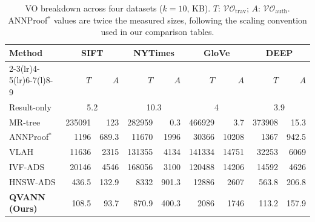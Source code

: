 \begin{table}[!t]
\centering
\caption{VO breakdown across four datasets ($k=10$, KB). $T$: $\mathcal{VO}_{\mathrm{trav}}$; $A$: $\mathcal{VO}_{\mathrm{auth}}$. ANNProof$^{*}$ values are twice the measured sizes, following the scaling convention used in our comparison tables.}
\label{tab:vo_breakdown_adjusted}
\vspace{-0.2cm}
\footnotesize
\setlength{\tabcolsep}{2pt}
\renewcommand{\arraystretch}{1.1}
\begin{tabular}{@{}l*{4}{rr}@{}}
\toprule
\multirow{2}{*}{Method} & \multicolumn{2}{c}{\textsf{SIFT}} & \multicolumn{2}{c}{\textsf{NYTimes}} & \multicolumn{2}{c}{\textsf{GloVe}} & \multicolumn{2}{c}{\textsf{DEEP}} \\
\cmidrule(lr){2-3}\cmidrule(lr){4-5}\cmidrule(lr){6-7}\cmidrule(l){8-9}
& $T$ & $A$ & $T$ & $A$ & $T$ & $A$ & $T$ & $A$ \\
\midrule
Result-only & \multicolumn{2}{c}{5.2} & \multicolumn{2}{c}{10.3} & \multicolumn{2}{c}{4} & \multicolumn{2}{c}{3.9} \\
\hline
\textsf{MR-tree} & 235091 & 123 & 282959 & 0.3 & 466929 & 3.7 & 373908 & 15.3 \\
\textsf{ANNProof}$^{*}$ & 1196 & 689.3 & 11670 & 1996 & 30366 & 10208 & 1367 & 942.5 \\
\textsf{VLAH} & 11636 & 2315 & 131355 & 4134 & 141334 & 14751 & 32253 & 6069 \\
\textsf{IVF-ADS} & 20146 & 4546 & 168056 & 3100 & 120488 & 14206 & 14592 & 4626 \\
\textsf{HNSW-ADS} & 436.5 & 132.9 & 8332 & 901.3 & 12886 & 2607 & 563.8 & 206.8 \\
\textbf{\textsf{QVANN} (Ours)} & 108.5 & 93.7 & 870.9 & 400.3 & 2086 & 1746 & 113.2 & 157.9 \\
\bottomrule
\end{tabular}
\end{table}
